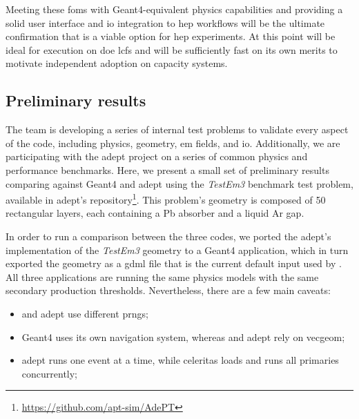 Meeting these \acp{fom} with Geant4-equivalent physics capabilities and
providing a solid user interface and \ac{io} integration to \ac{hep} workflows
will be the ultimate confirmation that \celeritas is a viable option for
\ac{hep} experiments. At this point \celeritas will be ideal for execution on
\ac{doe} \acp{lcf} and will be sufficiently fast on its own merits to motivate
independent adoption on capacity systems.

\subsection{Preliminary results}

The \celeritas team is developing a series of internal test problems to validate
every aspect of the code, including physics, geometry, \ac{em} fields, and
\ac{io}. Additionally, we are participating with the \acs{adept} project on a
series of common physics and performance benchmarks. Here, we present a small
set of preliminary results comparing \celeritas against Geant4 and \acs{adept}
using the \emph{TestEm3} benchmark test problem, available in \acs{adept}'s
repository\footnote {
    \url{https://github.com/apt-sim/AdePT}
}. This problem's geometry is composed of 50 rectangular layers, each
containing a Pb absorber and a liquid Ar gap.

In order to run a comparison between the three codes, we ported the
\acs{adept}'s implementation of the \emph{TestEm3} geometry to a Geant4
application, which in turn exported the geometry as a \acs{gdml} file that is
the current default input used by \celeritas. All three applications are running
the same physics models with the same secondary production thresholds.
Nevertheless, there are a few main caveats:
\begin{itemize}[itemsep=0pt]
    \item \celeritas and \acs{adept} use different \acp{prng};
    \item Geant4 uses its own navigation system, whereas \celeritas and
    \acs{adept} rely on \acs{vecgeom};
    \item \acs{adept} runs one event at a time, while celeritas loads and runs
    all primaries concurrently;
\end{itemize}

